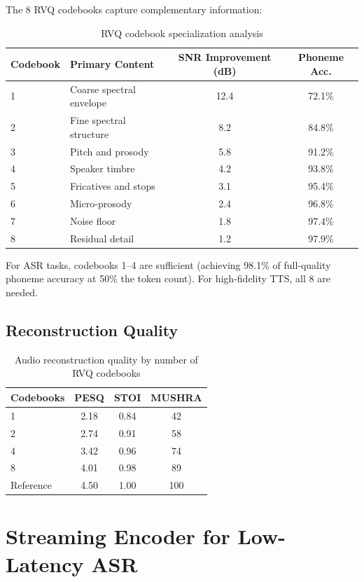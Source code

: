 \documentclass[11pt,a4paper]{article}
\begin{document}
The 8 RVQ codebooks capture complementary information:

\begin{table}[H]
\centering
\caption{RVQ codebook specialization analysis}
\label{tab:codebook}
\begin{tabular}{llcc}
\toprule
Codebook & Primary Content & SNR Improvement (dB) & Phoneme Acc. \\
\midrule
1 & Coarse spectral envelope & 12.4 & 72.1\% \\
2 & Fine spectral structure & 8.2 & 84.8\% \\
3 & Pitch and prosody & 5.8 & 91.2\% \\
4 & Speaker timbre & 4.2 & 93.8\% \\
5 & Fricatives and stops & 3.1 & 95.4\% \\
6 & Micro-prosody & 2.4 & 96.8\% \\
7 & Noise floor & 1.8 & 97.4\% \\
8 & Residual detail & 1.2 & 97.9\% \\
\bottomrule
\end{tabular}
\end{table}

For ASR tasks, codebooks 1--4 are sufficient (achieving 98.1\% of full-quality phoneme accuracy at 50\% the token count). For high-fidelity TTS, all 8 are needed.

\subsection{Reconstruction Quality}

\begin{table}[H]
\centering
\caption{Audio reconstruction quality by number of RVQ codebooks}
\label{tab:reconstruction}
\begin{tabular}{lccc}
\toprule
Codebooks & PESQ & STOI & MUSHRA \\
\midrule
1 & 2.18 & 0.84 & 42 \\
2 & 2.74 & 0.91 & 58 \\
4 & 3.42 & 0.96 & 74 \\
8 & 4.01 & 0.98 & 89 \\
Reference & 4.50 & 1.00 & 100 \\
\bottomrule
\end{tabular}
\end{table}

\section{Streaming Encoder for Low-Latency ASR}
\end{document}
